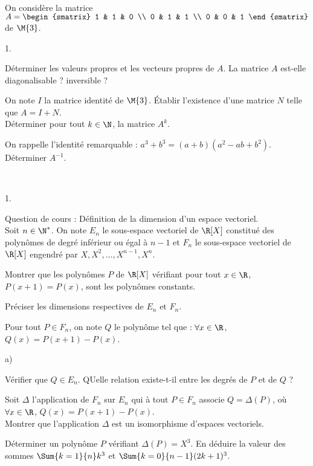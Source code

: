 \documentclass[11pt]{article}%
\begin{document}
\begin{exerciceSP}~\\
  On considère la matrice $A = 
  \begin{smatrix} 
    1 & 1 & 0 \\
    0 & 1 & 1 \\
    0 & 0 & 1
  \end{smatrix}$ de $\M{3}$.
  \begin{noliste}{1.}
    \setlength{\itemsep}{2mm}
  \item Déterminer les valeurs propres et les vecteurs propres de
    $A$. La matrice $A$ est-elle diagonalisable ? inversible ?
  \item On note $I$ la matrice identité de $\M{3}$. Établir
    l'existence d'une matrice $N$ telle que $A=I+N$.\\
    Déterminer pour tout $k\in\N$, la matrice $A^k$.
  \item On rappelle l'identité remarquable :
    $a^3+b^3=(a+b)(a^2-ab+b^2)$. Déterminer $A^{-1}$.
  \end{noliste}
\end{exerciceSP}


\newpage


\begin{exerciceAP}~
  \begin{noliste}{1.}
    \setlength{\itemsep}{2mm}
  \item Question de cours : Définition de la dimension d'un espace
    vectoriel.\\
    Soit $n\in\N^*$. On note $E_n$ le sous-espace vectoriel de $\R[X]$
    constitué des polynômes de degré inférieur ou égal à $n-1$ et
    $F_n$ le sous-espace vectoriel de $\R[X]$ engendré par $X,X^2,
    \hdots, X^{n-1}, X^n$.

  \item Montrer que les polynômes $P$ de $\R[X]$ vérifiant pour tout
    $x\in\R$, $P(x+1) = P(x)$, sont les polynômes constants.
  \item Préciser les dimensions respectives de $E_n$ et $F_n$.
  \item Pour tout $P\in F_n$, on note $Q$ le polynôme tel que :
    $\forall x\in\R$, $Q(x) = P(x+1) - P(x)$.
    \begin{noliste}{a)}
    \setlength{\itemsep}{2mm}
    \item Vérifier que $Q\in E_n$. QUelle relation existe-t-il entre
      les degrés de $P$ et de $Q$ ?
    \item Soit $\Delta$ l'application de $F_n$ sur $E_n$ qui à tout
      $P\in F_n$ associe $Q=\Delta (P)$, où $\forall x\in\R$,
      $Q(x) = P(x+1)- P(x)$.\\
      Montrer que l'application $\Delta$ est un isomorphisme d'espaces
      vectoriels.
    \item Déterminer un polynôme $P$ vérifiant $\Delta (P)=X^3$. En
      déduire la valeur des sommes $\Sum{k=1}{n} k^3$ et
      $\Sum{k=0}{n-1} (2k+1)^3$.
    \end{noliste}
  \end{noliste}
\end{exerciceAP}
\end{document}
